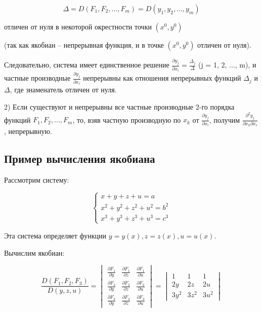 {\[
\Delta = D(F_1, F_2, \ldots, F_m) = D(y_1, y_2, \ldots, y_m)
\]



отличен от нуля в некоторой окрестности точки \( (x^0, y^0) \)

(так как якобиан – непрерывная функция, и в точке \( (x^0, y^0) \) отличен от нуля).

Следовательно, система имеет единственное решение \( \frac{\partial y_j}{\partial x_i} = \frac{\Delta_j}{\Delta} \) (j = 1, 2, ..., m), и частные производные \( \frac{\partial y_j}{\partial x_i} \) непрерывны как отношения непрерывных функций \( \Delta_j \) и \( \Delta \), где знаменатель отличен от нуля.

2) Если существуют и непрерывны все частные производные 2-го порядка функций \( F_1, F_2, \ldots, F_m \), то, взяв частную производную по \( x_k \) от \( \frac{\partial y_j}{\partial x_i} \), получим \( \frac{\partial^2 y_j}{\partial x_k \partial x_i} \), непрерывную.

\subsection*{Пример вычисления якобиана}

Рассмотрим систему:



\[
\begin{cases}
x + y + z + u = a \\
x^2 + y^2 + z^2 + u^2 = b^2 \\
x^3 + y^3 + z^3 + u^3 = c^3
\end{cases}
\]



Эта система определяет функции \( y = y(x), z = z(x), u = u(x) \).

Вычислим якобиан:



\[
\frac{D(F_1, F_2, F_3)}{D(y, z, u)} =
\begin{vmatrix}
\frac{\partial F_1}{\partial y} & \frac{\partial F_1}{\partial z} & \frac{\partial F_1}{\partial u} \\
\frac{\partial F_2}{\partial y} & \frac{\partial F_2}{\partial z} & \frac{\partial F_2}{\partial u} \\
\frac{\partial F_3}{\partial y} & \frac{\partial F_3}{\partial z} & \frac{\partial F_3}{\partial u}
\end{vmatrix}
=
\begin{vmatrix}
1 & 1 & 1 \\
2y & 2z & 2u \\
3y^2 & 3z^2 & 3u^2
\end{vmatrix}
\]



}

